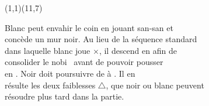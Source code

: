 \documentclass[preview, border=0pt, varwidth=false]{standalone}
\begin{document}
	\setgounit{0.6cm} 
	
\parbox[c][14.65cm][c]{10.2cm}{
	\centering
	
	\begin{psgopartialboard}{(1,1)(11,7)}
		\pass
	\end{psgopartialboard}
	
	\vspace{1em}
	Blanc peut envahir le coin en jouant san-san  et \\ concède un mur noir. 
	Au lieu de la séquence standard \\ dans laquelle blanc joue {\large $\boldsymbol{\times}$}, il descend en  afin de \\consolider le nobi \, avant de pouvoir pousser \\ en . Noir doit poursuivre de  à . Il en \\  résulte les deux faiblesses $\triangle$, que noir ou blanc peuvent \\  résoudre plus tard dans la partie.
}
\end{document}
